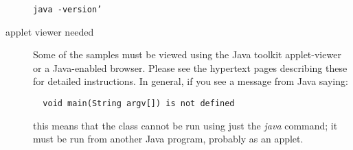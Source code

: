 \begin{description}
\begin{verbatim}
java -version’
\end{verbatim}
\item[applet viewer needed] Some of the samples must be viewed using the Java toolkit applet-viewer or a Java-enabled browser. Please see the hypertext pages describing these for detailed instructions. In general, if you see a message from Java saying:
\begin{verbatim}
  void main(String argv[]) is not defined
\end{verbatim}
this means that the class cannot be run using just the \emph{java} command; it must be run from another Java program, probably as an applet.
\end{description} 